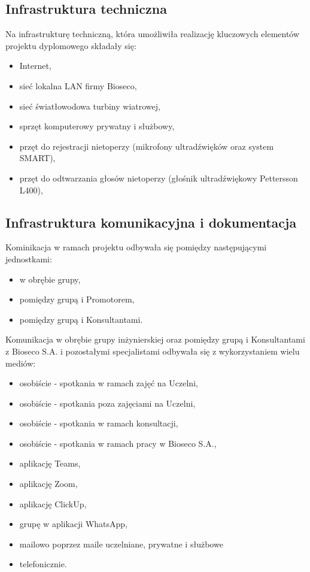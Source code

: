 \documentclass{sprz}
\begin{document}
\subsection{Infrastruktura techniczna}
Na infrastrukturę techniczną, która umożliwiła realizację kluczowych elementów projektu dyplomowego składały się:
\begin{itemize}
  \item{Internet,}
  \item{sieć lokalna LAN firmy Bioseco,}
  \item{sieć światłowodowa turbiny wiatrowej,}
  \item{sprzęt komputerowy prywatny i służbowy,}
  \item{przęt do rejestracji nietoperzy (mikrofony ultradźwięków oraz system SMART),}
  \item{przęt do odtwarzania głosów nietoperzy (głośnik ultradźwiękowy Pettersson L400),}
  \end{itemize}

\subsection{Infrastruktura komunikacyjna i dokumentacja}
Kominikacja w ramach projektu odbywała się pomiędzy następującymi jednostkami:
\begin{itemize}
  \item{w obrębie grupy,}
  \item{pomiędzy grupą i Promotorem,}
  \item{pomiędzy grupą i Konsultantami.}
  \end{itemize}

Komunikacja w obrębie grupy inżynierskiej oraz pomiędzy grupą i Konsultantami z Bioseco S.A. i pozostałymi specjalistami odbywała się z wykorzystaniem wielu mediów:
\begin{itemize}
  \item{osobiście - spotkania w ramach zajęć na Uczelni,}
  \item{osobiście - spotkania poza zajęciami na Uczelni,}
  \item{osobiście - spotkania w ramach konsultacji,}
  \item{osobiście - spotkania w ramach pracy w Bioseco S.A.,}
  \item{aplikację Teams,}
  \item{aplikację Zoom,}
  \item{aplikację ClickUp,}
  \item{grupę w aplikacji WhatsApp,}
  \item{mailowo poprzez maile uczelniane, prywatne i służbowe}
  \item{telefonicznie.}
  \end{itemize}
\end{document}
